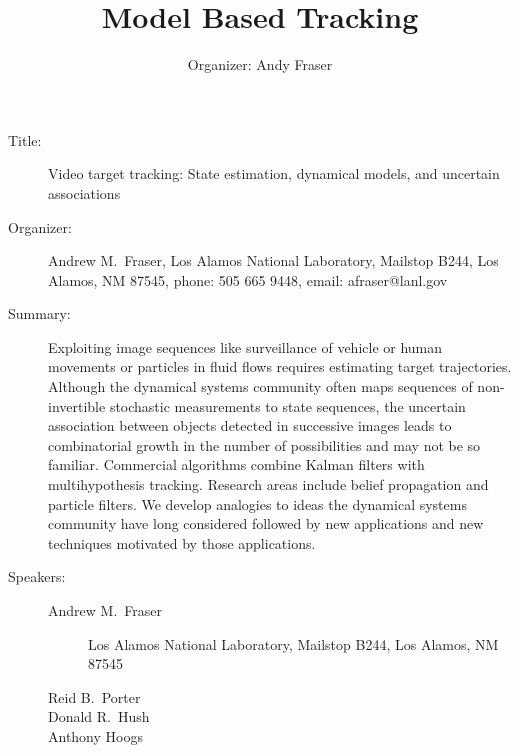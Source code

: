 \documentclass{article}
\title{Model Based Tracking}
\author{Organizer: Andy Fraser}
\begin{document}
\begin{description}
\item[Title:] Video target tracking: State estimation, dynamical
  models, and uncertain associations
\item[Organizer:] Andrew M.~Fraser, Los Alamos National Laboratory,
  Mailstop B244, Los Alamos, NM 87545, phone: 505 665 9448, email:
  afraser@lanl.gov
\item[Summary:] %
  Exploiting image sequences like surveillance of vehicle or human
  movements or particles in fluid flows requires estimating target
  trajectories.  Although the dynamical systems community often maps
  sequences of non-invertible stochastic measurements to state
  sequences, the uncertain association between objects detected in
  successive images leads to combinatorial growth in the number of
  possibilities and may not be so familiar.  Commercial algorithms
  combine Kalman filters with multihypothesis tracking.  Research
  areas include belief propagation and particle filters.  We develop
  analogies to ideas the dynamical systems community have long
  considered followed by new applications and new techniques motivated
  by those applications.
  \item[Speakers:]\hspace{1em}
    \begin{description}
    \item[Andrew M.~Fraser] Los Alamos National Laboratory, Mailstop
      B244, Los Alamos, NM 87545
    \item[Reid B.~Porter]
    \item[Donald R.~Hush]
    \item[Anthony Hoogs] 
    \end{description}
\end{description}
\end{document}
